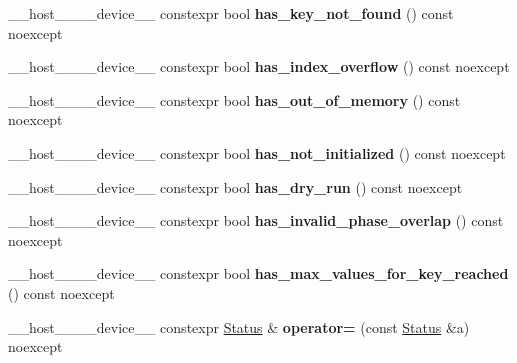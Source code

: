 \begin{DoxyCompactItemize}
\+\_\+\+\_\+host\+\_\+\+\_\+\+\_\+\+\_\+device\+\_\+\+\_\+ constexpr bool {\bfseries has\+\_\+key\+\_\+not\+\_\+found} () const noexcept
\item 
\mbox{\label{classwarpcore_1_1Status_aa32c7617ab25e76385f727b43a819757}} 
\+\_\+\+\_\+host\+\_\+\+\_\+\+\_\+\+\_\+device\+\_\+\+\_\+ constexpr bool {\bfseries has\+\_\+index\+\_\+overflow} () const noexcept
\item 
\mbox{\label{classwarpcore_1_1Status_ab055be1303858f29c41142a33a817cef}} 
\+\_\+\+\_\+host\+\_\+\+\_\+\+\_\+\+\_\+device\+\_\+\+\_\+ constexpr bool {\bfseries has\+\_\+out\+\_\+of\+\_\+memory} () const noexcept
\item 
\mbox{\label{classwarpcore_1_1Status_a3d0308deca5d97d37fadb665e9b05ad4}} 
\+\_\+\+\_\+host\+\_\+\+\_\+\+\_\+\+\_\+device\+\_\+\+\_\+ constexpr bool {\bfseries has\+\_\+not\+\_\+initialized} () const noexcept
\item 
\mbox{\label{classwarpcore_1_1Status_ad94de2f2a6919c84cd06e79b97c56fae}} 
\+\_\+\+\_\+host\+\_\+\+\_\+\+\_\+\+\_\+device\+\_\+\+\_\+ constexpr bool {\bfseries has\+\_\+dry\+\_\+run} () const noexcept
\item 
\mbox{\label{classwarpcore_1_1Status_af3bce89d282fcba29ccc82ab71340848}} 
\+\_\+\+\_\+host\+\_\+\+\_\+\+\_\+\+\_\+device\+\_\+\+\_\+ constexpr bool {\bfseries has\+\_\+invalid\+\_\+phase\+\_\+overlap} () const noexcept
\item 
\mbox{\label{classwarpcore_1_1Status_aff72d8791d406411dc8131236402537a}} 
\+\_\+\+\_\+host\+\_\+\+\_\+\+\_\+\+\_\+device\+\_\+\+\_\+ constexpr bool {\bfseries has\+\_\+max\+\_\+values\+\_\+for\+\_\+key\+\_\+reached} () const noexcept
\item 
\mbox{\label{classwarpcore_1_1Status_a8edc01c22ee98087660028978ad0f1cd}} 
\+\_\+\+\_\+host\+\_\+\+\_\+\+\_\+\+\_\+device\+\_\+\+\_\+ constexpr \hyperlink{classwarpcore_1_1Status}{Status} \& {\bfseries operator=} (const \hyperlink{classwarpcore_1_1Status}{Status} \&a) noexcept
\item 
\mbox{\label{classwarpcore_1_1Status_ab3a333d279f2de191979d54b01c716ac}} 

\end{DoxyCompactItemize}
